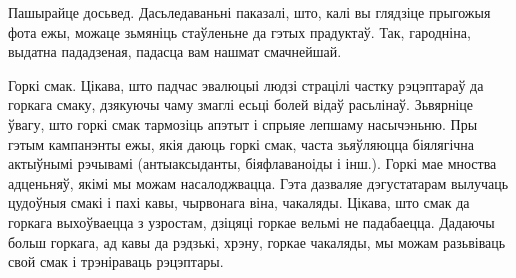 Пашырайце досьвед.
Дасьледаваньні паказалі, што, калі вы глядзіце прыгожыя фота ежы, можаце зьмяніць стаўленьне да гэтых прадуктаў. Так, гародніна, выдатна пададзеная, падасца вам нашмат смачнейшай.

Горкі смак.
Цікава, што падчас эвалюцыі людзі страцілі частку рэцэптараў да горкага смаку, дзякуючы чаму змаглі есьці болей відаў расьлінаў. Зьвярніце ўвагу, што горкі смак тармозіць апэтыт і спрыяе лепшаму насычэньню. Пры гэтым кампанэнты ежы, якія даюць горкі смак, часта зьяўляюцца біялягічна актыўнымі рэчывамі (антыаксыданты, біяфлаваноіды і інш.). Горкі мае мноства адценьняў, якімі мы можам насалоджвацца. Гэта дазваляе дэгустатарам вылучаць цудоўныя смакі і пахі кавы, чырвонага віна, чакаляды. Цікава, што смак да горкага выхоўваецца з узростам, дзіцяці горкае вельмі не падабаецца. Дадаючы больш горкага, ад кавы да рэдзькі, хрэну, горкае чакаляды, мы можам разьвіваць свой смак і трэніраваць рэцэптары.
